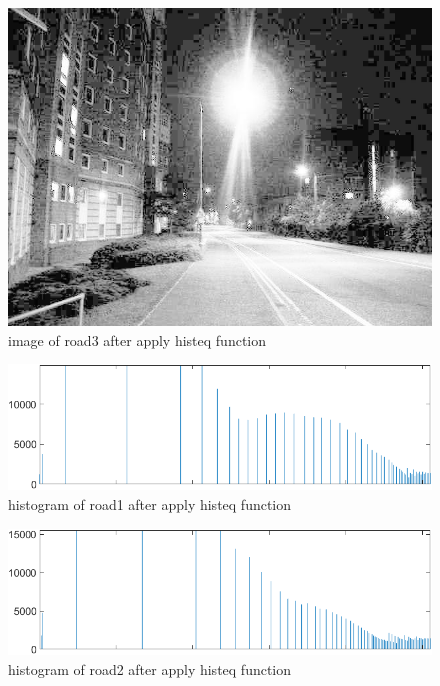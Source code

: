 \documentclass[
	12pt, %
]{fphw}
\begin{document}
\begin{figure}[H]
 
	\centering
	\includegraphics[width=1\columnwidth]{T2/result/I3_global.jpg} 
	\caption{image of road3 after apply histeq function}
	\label{fig18}
\end{figure}
\begin{figure}[H]
 
	\centering
	\includegraphics[width=1\columnwidth]{T2/result/hist1_global.png} 
	\caption{histogram of road1 after apply histeq function}
	\label{fig19}
\end{figure}
\begin{figure}[H]
 
	\centering
	\includegraphics[width=1\columnwidth]{T2/result/hist2_global.png} 
	\caption{histogram of road2 after apply histeq function}
	\label{fig20}
\end{figure}
\end{document}
